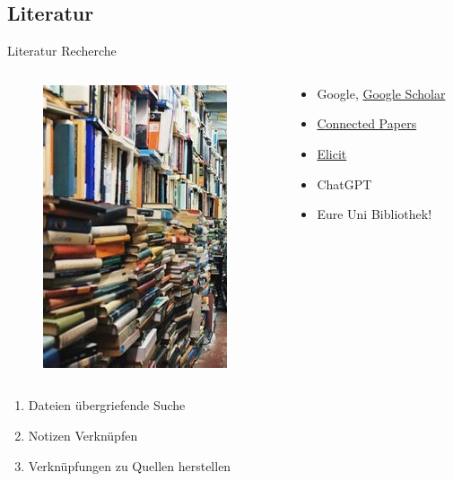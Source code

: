 \documentclass[aspectratio=169,shownotes]{beamer}
\begin{document}
\subsection{Literatur}
\begin{frame}{Literatur Recherche}
    \begin{columns}[t]
        \begin{column}{0.29\textwidth}
            \vspace*{-0.1\textheight}
            \begin{figure}[t]
                \includegraphics[height=0.8\textheight]{graphics/LiteraturChaos.jpeg}         
            \end{figure}
        \end{column}        
        \begin{column}{0.69\textwidth}
            \begin{itemize}
                \item Google, \href{https://scholar.google.com/}{Google Scholar}
                \item \href{https://www.connectedpapers.com/}{Connected Papers}
                \item \href{https://elicit.com/}{Elicit}
                \item ChatGPT
                \item Eure Uni Bibliothek!
            \end{itemize}           
        \end{column}        
    \end{columns}  
    \begin{enumerate}
        \item Dateien übergriefende Suche
        \item Notizen Verknüpfen
        \item Verknüpfungen zu Quellen herstellen
    \end{enumerate}  
\end{frame}
\end{document}
